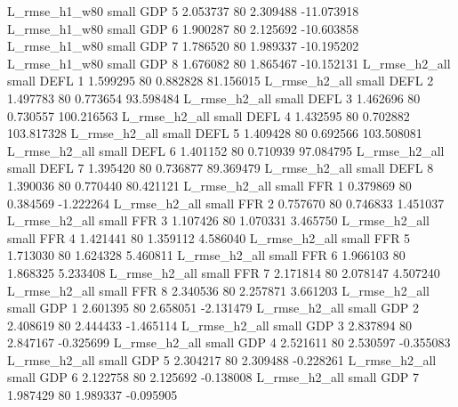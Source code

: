  L_rmse_h1_w80      small      GDP                 5 2.053737 80       2.309488         -11.073918
 L_rmse_h1_w80      small      GDP                 6 1.900287 80       2.125692         -10.603858
 L_rmse_h1_w80      small      GDP                 7 1.786520 80       1.989337         -10.195202
 L_rmse_h1_w80      small      GDP                 8 1.676082 80       1.865467         -10.152131
 L_rmse_h2_all      small     DEFL                 1 1.599295 80       0.882828          81.156015
 L_rmse_h2_all      small     DEFL                 2 1.497783 80       0.773654          93.598484
 L_rmse_h2_all      small     DEFL                 3 1.462696 80       0.730557         100.216563
 L_rmse_h2_all      small     DEFL                 4 1.432595 80       0.702882         103.817328
 L_rmse_h2_all      small     DEFL                 5 1.409428 80       0.692566         103.508081
 L_rmse_h2_all      small     DEFL                 6 1.401152 80       0.710939          97.084795
 L_rmse_h2_all      small     DEFL                 7 1.395420 80       0.736877          89.369479
 L_rmse_h2_all      small     DEFL                 8 1.390036 80       0.770440          80.421121
 L_rmse_h2_all      small      FFR                 1 0.379869 80       0.384569          -1.222264
 L_rmse_h2_all      small      FFR                 2 0.757670 80       0.746833           1.451037
 L_rmse_h2_all      small      FFR                 3 1.107426 80       1.070331           3.465750
 L_rmse_h2_all      small      FFR                 4 1.421441 80       1.359112           4.586040
 L_rmse_h2_all      small      FFR                 5 1.713030 80       1.624328           5.460811
 L_rmse_h2_all      small      FFR                 6 1.966103 80       1.868325           5.233408
 L_rmse_h2_all      small      FFR                 7 2.171814 80       2.078147           4.507240
 L_rmse_h2_all      small      FFR                 8 2.340536 80       2.257871           3.661203
 L_rmse_h2_all      small      GDP                 1 2.601395 80       2.658051          -2.131479
 L_rmse_h2_all      small      GDP                 2 2.408619 80       2.444433          -1.465114
 L_rmse_h2_all      small      GDP                 3 2.837894 80       2.847167          -0.325699
 L_rmse_h2_all      small      GDP                 4 2.521611 80       2.530597          -0.355083
 L_rmse_h2_all      small      GDP                 5 2.304217 80       2.309488          -0.228261
 L_rmse_h2_all      small      GDP                 6 2.122758 80       2.125692          -0.138008
 L_rmse_h2_all      small      GDP                 7 1.987429 80       1.989337          -0.095905

